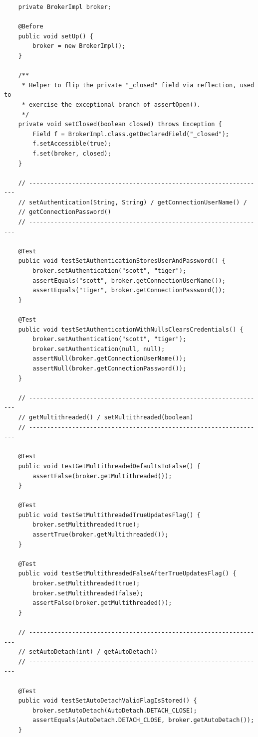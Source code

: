 \begin{lstlisting}
    private BrokerImpl broker;

    @Before
    public void setUp() {
        broker = new BrokerImpl();
    }

    /**
     * Helper to flip the private "_closed" field via reflection, used to
     * exercise the exceptional branch of assertOpen().
     */
    private void setClosed(boolean closed) throws Exception {
        Field f = BrokerImpl.class.getDeclaredField("_closed");
        f.setAccessible(true);
        f.set(broker, closed);
    }

    // ------------------------------------------------------------------
    // setAuthentication(String, String) / getConnectionUserName() /
    // getConnectionPassword()
    // ------------------------------------------------------------------

    @Test
    public void testSetAuthenticationStoresUserAndPassword() {
        broker.setAuthentication("scott", "tiger");
        assertEquals("scott", broker.getConnectionUserName());
        assertEquals("tiger", broker.getConnectionPassword());
    }

    @Test
    public void testSetAuthenticationWithNullsClearsCredentials() {
        broker.setAuthentication("scott", "tiger");
        broker.setAuthentication(null, null);
        assertNull(broker.getConnectionUserName());
        assertNull(broker.getConnectionPassword());
    }

    // ------------------------------------------------------------------
    // getMultithreaded() / setMultithreaded(boolean)
    // ------------------------------------------------------------------

    @Test
    public void testGetMultithreadedDefaultsToFalse() {
        assertFalse(broker.getMultithreaded());
    }

    @Test
    public void testSetMultithreadedTrueUpdatesFlag() {
        broker.setMultithreaded(true);
        assertTrue(broker.getMultithreaded());
    }

    @Test
    public void testSetMultithreadedFalseAfterTrueUpdatesFlag() {
        broker.setMultithreaded(true);
        broker.setMultithreaded(false);
        assertFalse(broker.getMultithreaded());
    }

    // ------------------------------------------------------------------
    // setAutoDetach(int) / getAutoDetach()
    // ------------------------------------------------------------------

    @Test
    public void testSetAutoDetachValidFlagIsStored() {
        broker.setAutoDetach(AutoDetach.DETACH_CLOSE);
        assertEquals(AutoDetach.DETACH_CLOSE, broker.getAutoDetach());
    }


\end{lstlisting}
